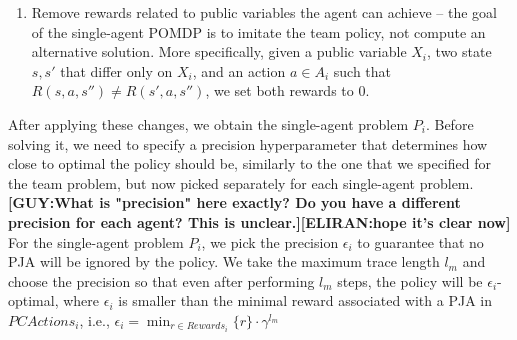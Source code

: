\documentclass[letterpaper]{article} %
\newcommand{\eliran}[1]{\textbf{[\color{red}ELIRAN:#1]}}
\newcommand{\ronen}[1]{\textbf{[\color{blue}RONEN:#1]}}
\newcommand{\guy}[1]{\textbf{[\color{orange}GUY:#1]}}
\begin{document}
\begin{enumerate}
\item Remove rewards related to public variables the agent
can achieve -- the goal of the single-agent POMDP is to imitate the team policy, not compute an alternative solution. More specifically, given a public variable $X_i$, two state $s, s'$ that differ only on $X_i$, and an action $a\in A_i$ such that $R(s, a, s'')\neq R(s', a, s'')$, we set both rewards to 0.
\end{enumerate}

After applying these changes, we obtain the single-agent problem $P_i$. Before solving it, we need to specify a precision hyperparameter that determines how close to optimal the policy should be, similarly to the one that we specified for the team problem, but now picked separately for each single-agent problem.
\guy{What is "precision" here exactly? Do you have a different precision for each agent? This is unclear.}\eliran{hope it's clear now}
For the single-agent problem $P_i$, we pick the precision $\epsilon_i$ to guarantee that no PJA will be ignored by the policy. We take the maximum trace length $l_m$ and choose the precision so that even after performing $l_m$ steps, the policy will be $\epsilon_i$-optimal, where $\epsilon_i$ is smaller than the minimal reward associated with a PJA in $PCActions_i$,
i.e., $\epsilon_i=\min_{r\in Rewards_i}\{r\}\cdot\gamma^{l_m}$
\end{document}
